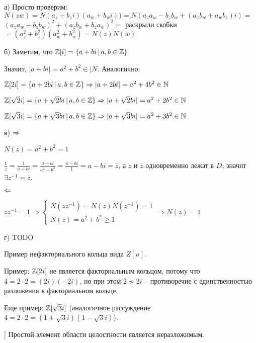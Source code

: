 \begin{solution}

а) Просто проверим: \(N(zw)= N(a_z + b_zi)(a_w + b_wi)) = N(a_za_w - b_zb_w + (a_zb_w + a_wb_z)i)=\)
\((a_za_w-b_zb_w)^2 + (a_zb_w + b_za_w)^2 =\)
раскрыли скобки
\(= (a_z^2 + b_z^2)(a_w^2 + b_w^2) = N(z)N(w)\)

б) Заметим, что \(\mathbb{Z}[i] = \{a + bi\,|\,a,b \in \mathbb{Z}\}\)

Значит, \(|a + bi| = a^2 + b^2 \in |N\). Аналогично:

\(\mathbb{Z}[2i] = \{a + 2bi\,|\,a,b \in \mathbb{Z}\} \Rightarrow |a + 2bi| = a^2 + 4b^2 \in \mathbb{N}\)

\(\mathbb{Z}[\sqrt{2}i] = \{a + \sqrt{2}bi\,|\,a,b \in \mathbb{Z}\} \Rightarrow |a + \sqrt{2}bi| = a^2 + 2b^2 \in \mathbb{N}\)

\(\mathbb{Z}[\sqrt{3}i] = \{a + \sqrt{3}bi\,|\,a,b \in \mathbb{Z}\} \Rightarrow |a + \sqrt{3}bi| = a^2 + 3b^2 \in \mathbb{N}\)

в) \(\Rightarrow\)

\(N(z) = a^2 + b^2 = 1\)

\(\frac{1}{z} = \frac{1}{a+bi} = \frac{a-bi}{a^2 + b^2} = \frac{a-bi}{1} = a-bi = \overline{z}\),
а \(z\) и \(\overline{z}\) одновременно лежат в \(D\), значит \(\exists z^{-1} = \overline{z}\).

\(\Leftarrow\)

\(zz^{-1} = 1 \Rightarrow \begin{cases} N(zz^{-1}) = N(z)N(z^{-1}) = 1 \\ N(z) = a^2 + b^2 \geqslant 1  \end{cases} \Rightarrow N(z) = 1\)

г) TODO

\end{solution}

\begin{problem}[3]
Пример нефакториального кольца вида $Z[u]$.
\end{problem}

\begin{solution}
Пример: \(\mathbb{Z}[2i]\) не является факториальным кольцом, потому что \(4 = 2\cdot2 = (2i)(-2i)\),
но при этом \(2 \nsim 2i\) -- противоречие с единственностью разложения в факториальном кольце.

Еще пример: \(\mathbb{Z}[\sqrt{3}i]\) (аналогичное рассуждение \(4 = 2\cdot 2 = (1+\sqrt{3}i)(1-\sqrt{3}i)\)).
\end{solution}

\begin{problem}[4 (2.7) [Каргальцев]]
Простой элемент области целостности является неразложимым.
\end{problem}

